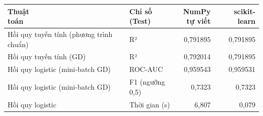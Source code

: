 \begin{tabular}{llrr}
\toprule
\makecell[l]{Thuật\\toán} & \makecell[l]{Chỉ số\\(Test)} & \makecell[r]{NumPy\\tự viết} & scikit-learn \\
\midrule
Hồi quy tuyến tính (phương trình chuẩn) & R² & 0{,}791895 & 0{,}791895 \\
Hồi quy tuyến tính (GD) & R² & 0{,}792014 & 0{,}791895 \\
Hồi quy logistic (mini-batch GD) & ROC-AUC & 0{,}959543 & 0{,}959531 \\
Hồi quy logistic (mini-batch GD) & F1 (ngưỡng 0,5) & 0{,}7323 & 0{,}7323 \\
Hồi quy logistic & Thời gian (s) & 6{,}807 & 0{,}079 \\
\bottomrule
\end{tabular}
